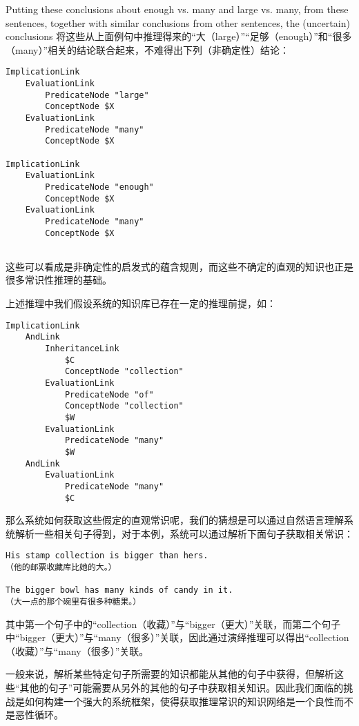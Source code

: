 Putting these conclusions about enough vs. many and large vs. many, from these sentences, together with similar conclusions from other sentences, the (uncertain) conclusions
将这些从上面例句中推理得来的“大（large）”“足够（enough）”和“很多（many）”相关的结论联合起来，不难得出下列（非确定性）结论：

  {\tt\begin{small}\begin{lstlisting}
ImplicationLink
	EvaluationLink
		PredicateNode "large"
		ConceptNode $X
	EvaluationLink
		PredicateNode "many"
		ConceptNode $X
		
ImplicationLink
	EvaluationLink
		PredicateNode "enough"
		ConceptNode $X
	EvaluationLink
		PredicateNode "many"
		ConceptNode $X
			
\end{lstlisting}\end{small}}

\noindent 这些可以看成是非确定性的启发式的蕴含规则，而这些不确定的直观的知识也正是很多常识性推理的基础。

上述推理中我们假设系统的知识库已存在一定的推理前提，如：

{\tt\begin{small}\begin{lstlisting}
ImplicationLink
	AndLink
		InheritanceLink
			$C
			ConceptNode "collection"
		EvaluationLink
			PredicateNode "of"
			ConceptNode "collection"
			$W
		EvaluationLink
			PredicateNode "many"
			$W
	AndLink
		EvaluationLink
			PredicateNode "many"
			$C
 \end{lstlisting}\end{small}}

\noindent 那么系统如何获取这些假定的直观常识呢，我们的猜想是可以通过自然语言理解系统解析一些相关句子得到，对于本例，系统可以通过解析下面句子获取相关常识：
\begin{verbatim}
His stamp collection is bigger than hers.
（他的邮票收藏库比她的大。）

The bigger bowl has many kinds of candy in it.
（大一点的那个碗里有很多种糖果。）
\end{verbatim}

\noindent 其中第一个句子中的“collection（收藏）”与“bigger（更大）”关联，而第二个句子中“bigger（更大）”与“many（很多）”关联，因此通过演绎推理可以得出“collection（收藏）”与“many（很多）”关联。

\noindent 一般来说，解析某些特定句子所需要的知识都能从其他的句子中获得，但解析这些“其他的句子”可能需要从另外的其他的句子中获取相关知识。因此我们面临的挑战是如何构建一个强大的系统框架，使得获取推理常识的知识网络是一个良性而不是恶性循环。

